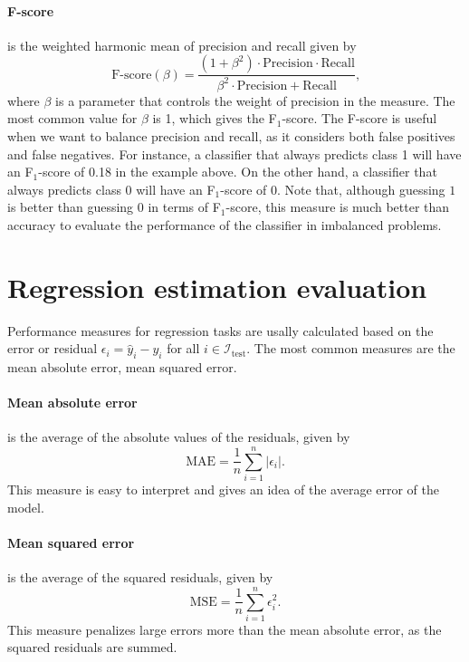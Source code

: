 \paragraph{F-score} is the weighted harmonic mean of precision and recall given by
\begin{equation*}
  \text{F-score}(\beta) =
    \frac%
      {(1 + \beta^2) \cdot \text{Precision} \cdot \text{Recall}}
      {\beta^2 \cdot \text{Precision} + \text{Recall}}\text{,}
\end{equation*}
where $\beta$ is a parameter that controls the weight of precision in the measure.  The
most common value for $\beta$ is 1, which gives the F$_1$-score.  The F-score is useful
when we want to balance precision and recall, as it considers both false positives and
false negatives.  For instance, a classifier that always predicts class 1 will have an
F$_1$-score of 0.18 in the example above.  On the other hand, a classifier that always
predicts class 0 will have an F$_1$-score of 0.  Note that, although guessing $1$ is
better than guessing $0$ in terms of F$_1$-score, this measure is much better than
accuracy to evaluate the performance of the classifier in imbalanced problems.

\section{Regression estimation evaluation}

Performance measures for regression tasks are usally calculated based on the error or residual
$\epsilon_i = \hat{y}_i - y_i$ for all $i \in \mathcal{I}_\text{test}$.  The most common measures
are the mean absolute error, mean squared error.

\paragraph{Mean absolute error} is the average of the absolute values of the residuals,
given by
\begin{equation*}
  \text{MAE} = \frac{1}{n} \sum_{i=1}^n | \epsilon_i |\text{.}
\end{equation*}
This measure is easy to interpret and gives an idea of the average error of the model.

\paragraph{Mean squared error} is the average of the squared residuals, given by
\begin{equation*}
  \text{MSE} = \frac{1}{n} \sum_{i=1}^n \epsilon_i^2\text{.}
\end{equation*}
This measure penalizes large errors more than the mean absolute error, as the squared
residuals are summed.


